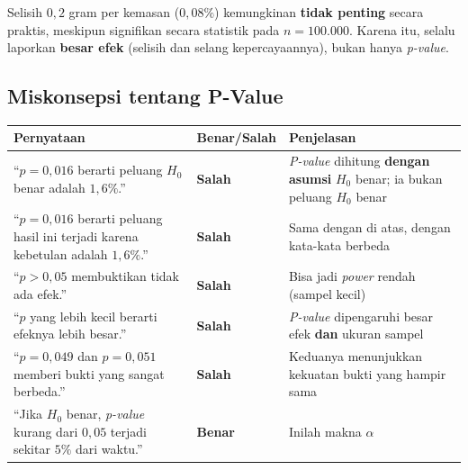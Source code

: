 \documentclass[
  indonesian,
  letterpaper,
]{book}
\newcounter{none} %
\begin{document}
Selisih \(0{,}2\) gram per kemasan (\(0{,}08\%\)) kemungkinan
\textbf{tidak penting} secara praktis, meskipun signifikan secara
statistik pada \(n = 100.000\). Karena itu, selalu laporkan
\textbf{besar efek} (selisih dan selang kepercayaannya), bukan hanya
\emph{p-value}.

\subsection{Miskonsepsi tentang
P-Value}\label{miskonsepsi-tentang-p-value}

{\def\LTcaptype{none} %
\begin{longtable}[]{@{}
  >{\raggedright\arraybackslash}p{}
  >{\centering\arraybackslash}p{}
  >{\raggedright\arraybackslash}p{}@{}}
\toprule\noalign{}
\begin{minipage}[b]{\linewidth}\raggedright
Pernyataan
\end{minipage} & \begin{minipage}[b]{\linewidth}\centering
Benar/Salah
\end{minipage} & \begin{minipage}[b]{\linewidth}\raggedright
Penjelasan
\end{minipage} \\
\midrule\noalign{}
\endhead
\bottomrule\noalign{}
\endlastfoot
``\(p = 0{,}016\) berarti peluang \(H_0\) benar adalah \(1{,}6\%\).'' &
\textbf{Salah} & \emph{P-value} dihitung \textbf{dengan asumsi} \(H_0\)
benar; ia bukan peluang \(H_0\) benar \\
``\(p = 0{,}016\) berarti peluang hasil ini terjadi karena kebetulan
adalah \(1{,}6\%\).'' & \textbf{Salah} & Sama dengan di atas, dengan
kata-kata berbeda \\
``\(p > 0{,}05\) membuktikan tidak ada efek.'' & \textbf{Salah} & Bisa
jadi \emph{power} rendah (sampel kecil) \\
``\(p\) yang lebih kecil berarti efeknya lebih besar.'' & \textbf{Salah}
& \emph{P-value} dipengaruhi besar efek \textbf{dan} ukuran sampel \\
``\(p = 0{,}049\) dan \(p = 0{,}051\) memberi bukti yang sangat
berbeda.'' & \textbf{Salah} & Keduanya menunjukkan kekuatan bukti yang
hampir sama \\
``Jika \(H_0\) benar, \emph{p-value} kurang dari \(0{,}05\) terjadi
sekitar \(5\%\) dari waktu.'' & \textbf{Benar} & Inilah makna
\(\alpha\) \\
\end{longtable}
}
\end{document}
